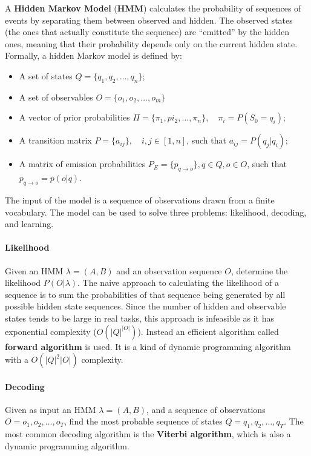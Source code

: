 A \textbf{Hidden Markov Model} (\textbf{HMM}) calculates the probability of sequences of events by separating them between observed and hidden. The observed states (the ones that actually constitute the sequence) are ``emitted'' by the hidden ones, meaning that their probability depends only on the current hidden state. Formally, a hidden Markov model is defined by:
\begin{itemize}[noitemsep]
    \item A set of states $Q = \{q_1, q_2, \dots, q_n\}$;
    \item A set of observables $O = \{o_1, o_2, \dots, o_m\}$
    \item A vector of prior probabilities $\Pi = \{\pi_1, pi_2, \dots, \pi_n\}, \quad \pi_i = P(S_0 = q_i)$;
    \item A transition matrix $P = \{ a_{ij} \}, \quad i,j \in [1,n]$, such that $a_{ij} = P(q_j|q_i)$;
    \item A matrix of emission probabilities $P_E = \{p_{q\rightarrow o}\}, q \in Q, o \in O$, such that $p_{q \rightarrow o} = p(o|q)$.
\end{itemize}
The input of the model is a sequence of observations drawn from a finite vocabulary. The model can be used to solve three problems: likelihood, decoding, and learning.

\paragraph{Likelihood} Given an HMM $\lambda=(A,B)$ and an observation sequence $O$, determine the likelihood $P(O|\lambda)$. The naive approach to calculating the likelihood of a sequence is to sum the probabilities of that sequence being generated by all possible hidden state sequences. Since the number of hidden and observable states tends to be large in real tasks, this approach is infeasible as it has exponential complexity ($O(|Q|^{|O|})$). Instead an efficient algorithm called \textbf{forward algorithm} is used. It is a kind of dynamic programming algorithm with a $O(|Q|^2 |O|)$ complexity.

\paragraph{Decoding} Given as input an HMM $\lambda = (A,B)$, and a sequence of observations $O=o_1, o_2, \dots, o_T$, find the most probable sequence of states  $Q = q_1, q_2, \dots, q_T$. The most common decoding algorithm is the \textbf{Viterbi algorithm}, which is also a dynamic programming algorithm.

